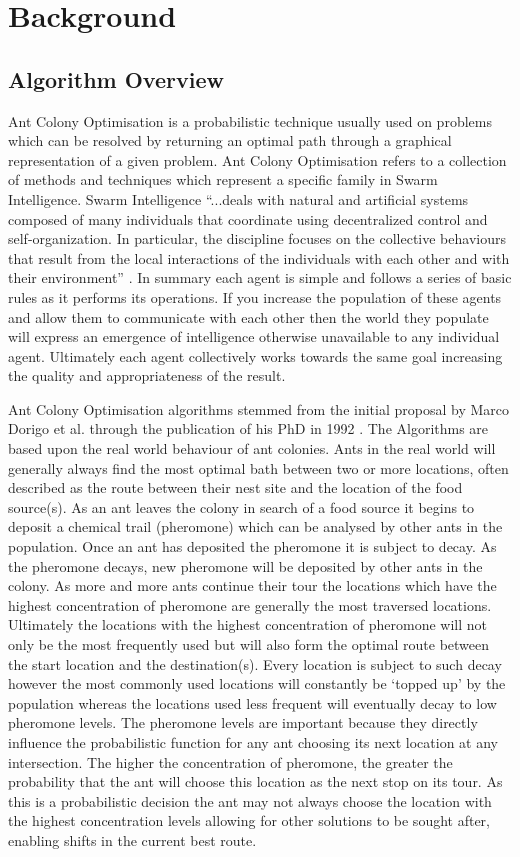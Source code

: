 \chapter{Background}
\label{chapt:bg}
\section{Algorithm Overview}
\label{agloover}
Ant Colony Optimisation is a probabilistic technique usually used on problems which can be resolved by returning an optimal path through a graphical representation of a given problem. Ant Colony Optimisation refers to a collection of methods and techniques which represent a specific family in Swarm Intelligence. Swarm Intelligence \enquote{...deals with natural and artificial systems composed of many individuals that coordinate using decentralized control and self-organization. In particular, the discipline focuses on the collective behaviours that result from the local interactions of the individuals with each other and with their environment} \cite{SI:def}. In summary each agent is simple and follows a series of basic rules as it performs its operations. If you increase the population of these agents and allow them to communicate with each other then the world they populate will express an emergence of intelligence otherwise unavailable to any individual agent. Ultimately each agent collectively works towards the same goal increasing the quality and appropriateness of the result.

Ant Colony Optimisation algorithms stemmed from the initial proposal by Marco Dorigo et al. through the publication of his PhD in 1992 \cite{Dor1992:thesis}. The Algorithms are based upon the real world behaviour of ant colonies. Ants in the real world will generally always find the most optimal bath between two or more locations, often described as the route between their nest site and the location of the food source(s). As an ant leaves the colony in search of a food source it begins to deposit a chemical trail (pheromone) which can be analysed by other ants in the population. Once an ant has deposited the pheromone it is subject to decay. As the pheromone decays, new pheromone will be deposited by other ants in the colony. As more and more ants continue their tour the locations which have the highest concentration of pheromone are generally the most traversed locations. Ultimately the locations with the highest concentration of pheromone will not only be the most frequently used but will also form the optimal route between the start location and the destination(s). Every location is subject to such decay however the most commonly used locations will constantly be ‘topped up’ by the population whereas the locations used less frequent will eventually decay to low pheromone levels. The pheromone levels are important because they directly influence the probabilistic function for any ant choosing its next location at any intersection. The higher the concentration of pheromone, the greater the probability that the ant will choose this location as the next stop on its tour. As this is a probabilistic decision the ant may not always choose the location with the highest concentration levels allowing for other solutions to be sought after, enabling shifts in the current best route.

